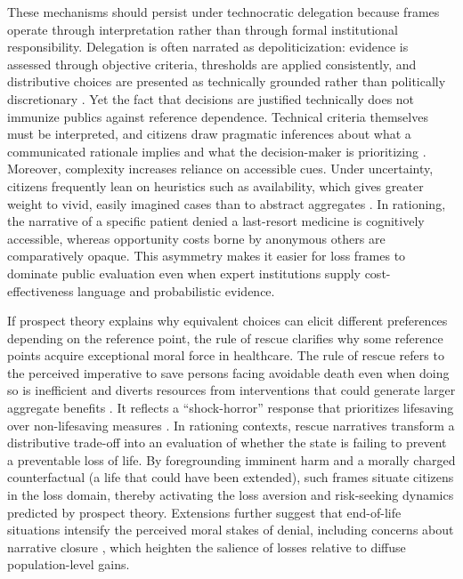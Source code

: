 \documentclass[11pt]{article}\usepackage[]{graphicx}\usepackage[]{xcolor}
\begin{document}
These mechanisms should persist under technocratic delegation because frames operate through interpretation rather than through formal institutional responsibility. Delegation is often narrated as depoliticization: evidence is assessed through objective criteria, thresholds are applied consistently, and distributive choices are presented as technically grounded rather than politically discretionary \parencite{Thatcher2002}. Yet the fact that decisions are justified technically does not immunize publics against reference dependence. Technical criteria themselves must be interpreted, and citizens draw pragmatic inferences about what a communicated rationale implies and what the decision-maker is prioritizing \parencite{Flusberg2024}. Moreover, complexity increases reliance on accessible cues. Under uncertainty, citizens frequently lean on heuristics such as availability, which gives greater weight to vivid, easily imagined cases than to abstract aggregates \parencite{Tversky1973a}. In rationing, the narrative of a specific patient denied a last-resort medicine is cognitively accessible, whereas opportunity costs borne by anonymous others are comparatively opaque. This asymmetry makes it easier for loss frames to dominate public evaluation even when expert institutions supply cost-effectiveness language and probabilistic evidence.

If prospect theory explains why equivalent choices can elicit different preferences depending on the reference point, the rule of rescue clarifies why some reference points acquire exceptional moral force in healthcare. The rule of rescue refers to the perceived imperative to save persons facing avoidable death even when doing so is inefficient and diverts resources from interventions that could generate larger aggregate benefits \parencite[2407]{McKie2003}. It reflects a “shock-horror” response that prioritizes lifesaving over non-lifesaving measures \parencite[2407]{McKie2003}. In rationing contexts, rescue narratives transform a distributive trade-off into an evaluation of whether the state is failing to prevent a preventable loss of life. By foregrounding imminent harm and a morally charged counterfactual (a life that could have been extended), such frames situate citizens in the loss domain, thereby activating the loss aversion and risk-seeking dynamics predicted by prospect theory. Extensions further suggest that end-of-life situations intensify the perceived moral stakes of denial, including concerns about narrative closure \parencite{Sinclair2022a}, which heighten the salience of losses relative to diffuse population-level gains.
\end{document}
